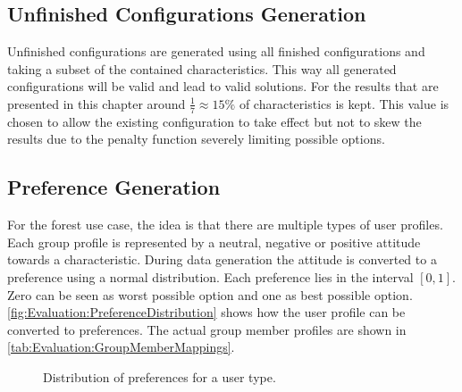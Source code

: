 \subsection{Unfinished Configurations Generation}

Unfinished configurations are generated using all finished configurations and taking a subset of the contained characteristics. This way all generated configurations will be valid and lead to valid solutions. For the results that are presented in this chapter around $\frac{1}{7} \approx 15\%$ of characteristics is kept. This value is chosen to allow the existing configuration to take effect but not to skew the results due to the penalty function severely limiting possible options.

\subsection{Preference Generation}

For the forest use case, the idea is that there are multiple types of user profiles. Each group profile is represented by a neutral, negative or positive attitude towards a characteristic. During data generation the attitude is converted to a preference using a normal distribution. Each preference lies in the interval $[0,1]$. Zero can be seen as worst possible option and one as best possible option.  \autoref{fig:Evaluation:PreferenceDistribution} shows how the user profile can be converted to preferences. The actual group member profiles are shown in \autoref{tab:Evaluation:GroupMemberMappings}.

\pgfplotsset{height=5cm,width=\textwidth,compat=1.8}
\begin{figure}
 \caption{Distribution of preferences for a user type.}
\label{fig:Evaluation:PreferenceDistribution}
\end{figure}


